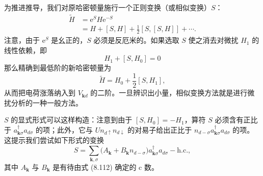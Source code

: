 为推进推导，我们对原哈密顿量施行一个正则变换（或相似变换）$S$：
\begin{equation*}
\begin{aligned}
\widetilde{H} &= \mathrm{e}^{S} H \mathrm{e}^{-S} \\
&= H + [S, H] + \frac{1}{2}[S, [S, H]] + \cdots.
\end{aligned}
\end{equation*}
注意，由于 $\mathrm{e}^{S}$ 是幺正的，$S$ 必须是反厄米的。如果选取 $S$ 使之消去对微扰 $H_{1}$ 的线性依赖，即
\begin{equation*}
H_{1} + [S, H_{0}] = 0
\tag{8.112}
\end{equation*}
那么精确到最低阶的新哈密顿量为
\begin{equation*}
\widetilde{H} = H_{0} + \frac{1}{2}[S, H_{1}],
\tag{8.113}
\end{equation*}
从而把电荷涨落纳入到 $V_{\mathbf{k}d}$ 的二阶。一旦辨识出小量，相似变换方法就是进行微扰分析的一种一般方法。

$S$ 的显式形式可以这样构造：注意到由于 $[S, H_{0}] = -H_{1}$，算符 $S$ 必须含有正比于 $a_{\mathbf{k}\sigma}^{\dagger} a_{d\sigma}$ 的项；此外，它与 $U n_{d\uparrow} n_{d\downarrow}$ 的对易子给出正比于 $n_{d-\sigma} a_{\mathbf{k}\sigma}^{\dagger} a_{d\sigma}$ 的项。这提示我们尝试如下形式的变换
\begin{equation*}
S = \sum_{\mathbf{k},\sigma} \big( A_{\mathbf{k}} + B_{\mathbf{k}} n_{d-\sigma} \big) a_{\mathbf{k}\sigma}^{\dagger} a_{d\sigma} - \mathrm{h.c.},
\tag{8.114}
\end{equation*}
其中 $A_{\mathbf{k}}$ 与 $B_{\mathbf{k}}$ 是有待由式 (8.112) 确定的 c 数。


